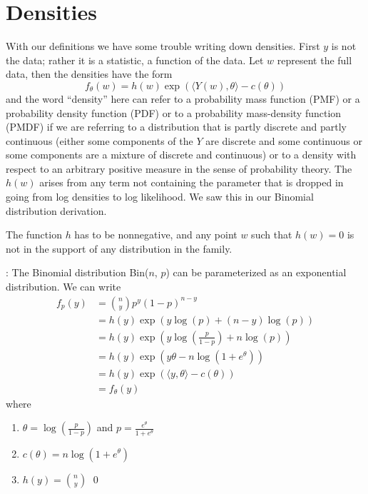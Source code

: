 \documentclass[12pt]{article}
\newcommand{\inner}[1]{\langle #1 \rangle}
\begin{document}
\section*{Densities}

With our definitions we have some trouble writing down densities. First $y$ is not the data; rather it is a statistic, a function of the data. Let $w$ represent the full data, then the densities have the form
\begin{equation} \label{expodens}
  f_\theta(w) = h(w)\exp\left(\inner{Y(w),\theta} - c(\theta)\right)
\end{equation}
and the word ``density'' here can refer to a probability mass function (PMF) or a probability density function (PDF) or to a probability mass-density function (PMDF) if we are referring to a distribution that is partly discrete and partly continuous (either some components of the $Y$ are discrete and some continuous or some components are a mixture of discrete and continuous) or to a density with respect to an arbitrary positive measure in the sense of probability theory. The $h(w)$ arises from any term not containing the parameter that is dropped in going from log densities to log likelihood. We saw this in our Binomial distribution derivation. 

The function $h$ has to be nonnegative, and any point $w$ such that $h(w) = 0$ is not in the support of any distribution in the family.


\vspace{0.5cm}: The Binomial distribution Bin($n$, $p$) can be parameterized as an exponential distribution. We can write
\begin{align*}
  	f_p(y) &= {n \choose y}p^y(1-p)^{n-y} \\
  	  &= h(y)\exp\left(y\log(p) + (n-y)\log(p)\right) \\
  	  &= h(y)\exp\left(y\log\left(\frac{p}{1-p}\right) + n\log(p)\right) \\
  	  &= h(y)\exp\left(y\theta - n\log\left(1 + e^\theta\right)\right) \\  	  
  	  &= h(y)\exp\left(\inner{y,\theta} - c(\theta)\right) \\
  	  &= f_\theta(y)
\end{align*}
where 
\begin{enumerate}
	\item[] $\theta = \log\left(\frac{p}{1-p}\right)$ and $p = \frac{e^\theta}{1 + e^\theta}$
	\item[] $c(\theta) = n\log\left(1 + e^\theta\right)$
	\item[] $h(y) = {n \choose y}$ \qed
\end{enumerate}
\end{document}
